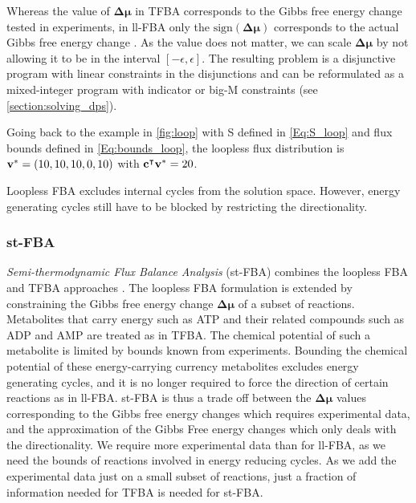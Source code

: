 Whereas the value of $\boldsymbol{\Delta \mu}$ in TFBA corresponds to the Gibbs free energy change tested in experiments, in ll-FBA only the $\text{sign}(\boldsymbol{\Delta \mu})$ corresponds to the actual Gibbs free energy change \cite{elimination_infeasible_loops}. 
As the value does not matter, we can scale $\boldsymbol{\Delta \mu}$ by not allowing it to be in the interval $[- \epsilon , \epsilon ]$.
The resulting problem is a disjunctive program with linear constraints in the disjunctions and can be reformulated as a mixed-integer program with indicator or big-M constraints (see \cref{section:solving_dps}). 


Going back to the example in \cref{fig:loop} with S defined in \cref{Eq:S_loop} and flux bounds defined in \cref{Eq:bounds_loop},  
the loopless flux distribution is $\bold v^* = (10,10,10,0,10)$ with $\bold c^\intercal \bold v^* = 20$. 

Loopless FBA excludes internal cycles from the solution space. However, energy generating cycles still have to be blocked by restricting the directionality.

\subsubsection{st-FBA}
\textit{Semi-thermodynamic Flux Balance Analysis} (st-FBA) combines the loopless FBA and TFBA approaches \cite{noor_removing_2018}. The loopless FBA formulation is extended by constraining the Gibbs free energy change $\boldsymbol{\Delta \mu}$ of a subset of reactions. Metabolites that carry energy such as ATP and their related compounds such as ADP and AMP are treated as in TFBA. The chemical potential of such a metabolite is limited by bounds known from experiments. Bounding the chemical potential of these energy-carrying currency metabolites excludes energy generating cycles, and it is no longer required to force the direction of certain reactions as in ll-FBA. 
st-FBA is thus a trade off between the $\boldsymbol{\Delta \mu}$ values corresponding to the Gibbs free energy changes which requires experimental data, and the approximation of the Gibbs Free energy changes which only deals with the directionality.
We require more experimental data than for ll-FBA, as we need the bounds of reactions involved in energy reducing cycles. As we add the experimental data just on a small subset of reactions, just a fraction of information needed for TFBA is needed for st-FBA.

